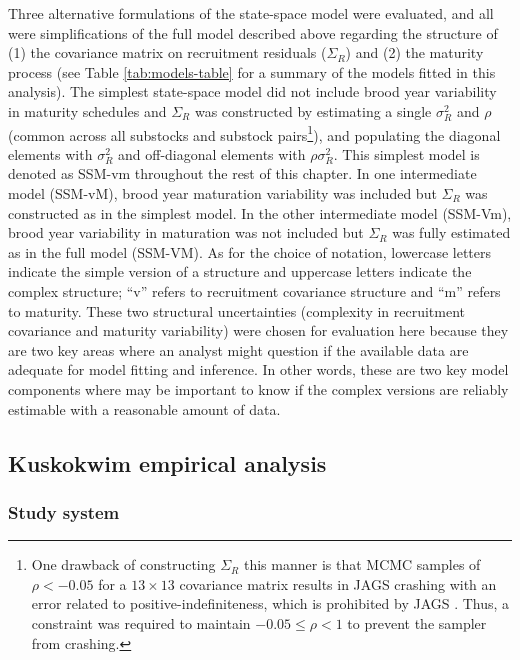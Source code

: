 \documentclass[12pt,]{book}
\let\rmarkdownfootnote\footnote%
\def\footnote{\protect\rmarkdownfootnote}
\theoremstyle{definition}
\theoremstyle{definition}
\theoremstyle{definition}
\theoremstyle{remark}
\begin{document}
Three alternative formulations of the state-space model were evaluated,
and all were simplifications of the full model described above regarding
the structure of (1) the covariance matrix on recruitment residuals
(\(\Sigma_R\)) and (2) the maturity process (see Table
\ref{tab:models-table} for a summary of the models fitted in this
analysis). The simplest state-space model did not include brood year
variability in maturity schedules and \(\Sigma_R\) was constructed by
estimating a single \(\sigma_R^2\) and \(\rho\) (common across all
substocks and substock pairs\footnote{One drawback of constructing
  \(\Sigma_R\) this manner is that MCMC samples of \(\rho < -0.05\) for
  a \(13 \times 13\) covariance matrix results in JAGS crashing with an
  error related to positive-indefiniteness, which is prohibited by JAGS
  \citep{plummer-2017}. Thus, a constraint was required to maintain
  \(-0.05 \le \rho < 1\) to prevent the sampler from crashing.}), and
populating the diagonal elements with \(\sigma_R^2\) and off-diagonal
elements with \(\rho \sigma_R^2\). This simplest model is denoted as
SSM-vm throughout the rest of this chapter. In one intermediate model
(SSM-vM), brood year maturation variability was included but
\(\Sigma_R\) was constructed as in the simplest model. In the other
intermediate model (SSM-Vm), brood year variability in maturation was
not included but \(\Sigma_R\) was fully estimated as in the full model
(SSM-VM). As for the choice of notation, lowercase letters indicate the
simple version of a structure and uppercase letters indicate the complex
structure; ``v'' refers to recruitment covariance structure and ``m''
refers to maturity. These two structural uncertainties (complexity in
recruitment covariance and maturity variability) were chosen for
evaluation here because they are two key areas where an analyst might
question if the available data are adequate for model fitting and
inference. In other words, these are two key model components where may
be important to know if the complex versions are reliably estimable with
a reasonable amount of data.

\subsection{Kuskokwim empirical
analysis}\label{kuskokwim-empirical-analysis}

\subsubsection{Study system}\label{study-system}
\end{document}
